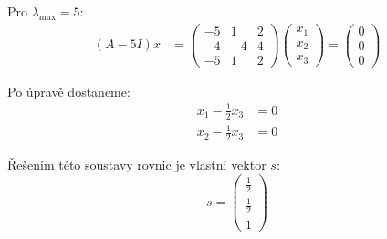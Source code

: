 \documentclass[10pt, a4paper]{ReportSheet}
\begin{document}
{        Pro $\lambda_{\max} = 5$:
        \begin{equation*}
            \begin{aligned}
            (A - 5I)
                x &= \begin{pmatrix}
                         -5 & 1  & 2 \\
                         -4 & -4 & 4 \\
                         -5 & 1  & 2
                \end{pmatrix} \begin{pmatrix}
                                  x_1 \\
                                  x_2 \\
                                  x_3
                \end{pmatrix} = \begin{pmatrix}
                                    0 \\
                                    0 \\
                                    0
                \end{pmatrix}
            \end{aligned}
        \end{equation*}

        Po úpravě dostaneme:
        \begin{equation*}
            \begin{aligned}
                x_1 - \frac{1}{2}x_3 &= 0 \\
                x_2 - \frac{1}{2}x_3 &= 0
            \end{aligned}
        \end{equation*}

        Řešením této soustavy rovnic je vlastní vektor $s$:
        \begin{equation*}
            s = \begin{pmatrix}
                    \frac{1}{2} \\
                    \frac{1}{2} \\
                    1
            \end{pmatrix}
        \end{equation*}

    }
\end{document}
